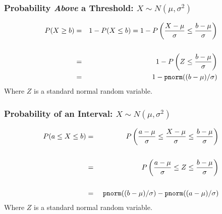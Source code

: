 \documentclass[handout]{beamer}
\begin{document}
\begin{frame}
  \frametitle{Probability \emph{Above} a Threshold: $X \sim N(\mu, \sigma^2)$}
\begin{eqnarray*}
	P(X \geq b) &=&1 - P(X\leq b) =1 - P\left( \frac{X-\mu}{\sigma} \leq \frac{b-\mu}{\sigma} \right) \\ \\
	&=& 1 - P\left( Z \leq \frac{b-\mu}{\sigma} \right) \\
	&=& 1 -\mbox{\texttt{pnorm}}((b-\mu)/\sigma)
\end{eqnarray*}
Where $Z$ is a standard normal random variable.
\end{frame}
\begin{frame}
\frametitle{Probability of an Interval: $X \sim N(\mu, \sigma^2)$}


\begin{eqnarray*}
	P(a \leq X \leq b) &=&  P\left( \frac{a - \mu}{\sigma} \leq \frac{X - \mu}{\sigma} \leq \frac{b-\mu}{\sigma} \right)\\ \\ 
	&=& P\left( \frac{a - \mu}{\sigma} \leq Z \leq \frac{b-\mu}{\sigma} \right)\\ \\ 
	&=&\ \mbox{\texttt{pnorm}}((b-\mu)/\sigma) -  \mbox{\texttt{pnorm}}((a-\mu)/\sigma)
\end{eqnarray*}
Where $Z$ is a standard normal random variable.
\end{frame}
\end{document}
